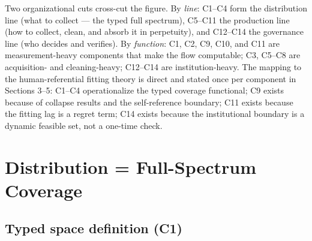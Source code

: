 \documentclass[10pt]{article}
\begin{document}
Two organizational cuts cross-cut the figure. By \emph{line}: C1--C4 form the distribution line (what to collect --- the typed full spectrum), C5--C11 the production line (how to collect, clean, and absorb it in perpetuity), and C12--C14 the governance line (who decides and verifies). By \emph{function}: C1, C2, C9, C10, and C11 are measurement-heavy components that make the flow computable; C3, C5--C8 are acquisition- and cleaning-heavy; C12--C14 are institution-heavy. The mapping to the human-referential fitting theory is direct and stated once per component in Sections 3--5: C1--C4 operationalize the typed coverage functional; C9 exists because of collapse results and the self-reference boundary; C11 exists because the fitting lag is a regret term; C14 exists because the institutional boundary is a dynamic feasible set, not a one-time check.

\section{Distribution = Full-Spectrum Coverage}

\subsection{Typed space definition (C1)}
\end{document}

